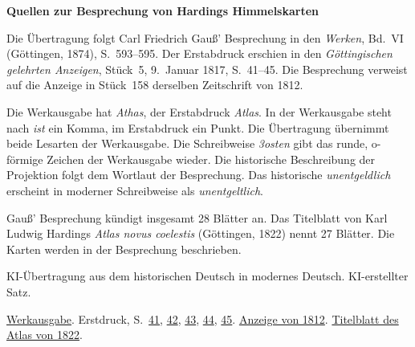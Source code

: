 \clearpage\thispagestyle{empty}
\begin{center}\Large\bfseries Quellen zur Besprechung von Hardings Himmelskarten\end{center}

Die Übertragung folgt Carl Friedrich Gauß’ Besprechung in den \emph{Werken}, Bd.~VI (Göttingen, 1874), S.~593--595. Der Erstabdruck erschien in den \emph{Göttingischen gelehrten Anzeigen}, Stück~5, 9.~Januar 1817, S.~41--45. Die Besprechung verweist auf die Anzeige in Stück~158 derselben Zeitschrift von 1812.

Die Werkausgabe hat \emph{Athas}, der Erstabdruck \emph{Atlas}. In der Werkausgabe steht nach \emph{ist} ein Komma, im Erstabdruck ein Punkt. Die Übertragung übernimmt beide Lesarten der Werkausgabe. Die Schreibweise \emph{3osten} gibt das runde, o-förmige Zeichen der Werkausgabe wieder. Die historische Beschreibung der Projektion folgt dem Wortlaut der Besprechung. Das historische \emph{unentgeldlich} erscheint in moderner Schreibweise als \emph{unentgeltlich}.

Gauß’ Besprechung kündigt insgesamt 28 Blätter an. Das Titelblatt von Karl Ludwig Hardings \emph{Atlas novus coelestis} (Göttingen, 1822) nennt 27 Blätter. Die Karten werden in der Besprechung beschrieben.

KI-Übertragung aus dem historischen Deutsch in modernes Deutsch. KI-erstellter Satz.

\href{https://gdz.sub.uni-goettingen.de/id/PPN236007467}{Werkausgabe}. Erstdruck, S.~\href{https://images.p.sub.uni-goettingen.de/iiif/image/gdz:PPN319721507_1817:00000043/full/1650,/0/default.jpg}{41}, \href{https://images.p.sub.uni-goettingen.de/iiif/image/gdz:PPN319721507_1817:00000044/full/1650,/0/default.jpg}{42}, \href{https://images.p.sub.uni-goettingen.de/iiif/image/gdz:PPN319721507_1817:00000045/full/1650,/0/default.jpg}{43}, \href{https://images.p.sub.uni-goettingen.de/iiif/image/gdz:PPN319721507_1817:00000046/full/1650,/0/default.jpg}{44}, \href{https://images.p.sub.uni-goettingen.de/iiif/image/gdz:PPN319721507_1817:00000047/full/1650,/0/default.jpg}{45}. \href{https://images.p.sub.uni-goettingen.de/iiif/image/gdz:PPN319721507_1812:00001613/full/1650,/0/default.jpg}{Anzeige von 1812}. \href{https://www.davidrumsey.com/luna/servlet/detail/RUMSEY~8~1~372238~90138977:Title--Atlas-novus-coelestis-XXVII-}{Titelblatt des Atlas von 1822}.

\clearpage
